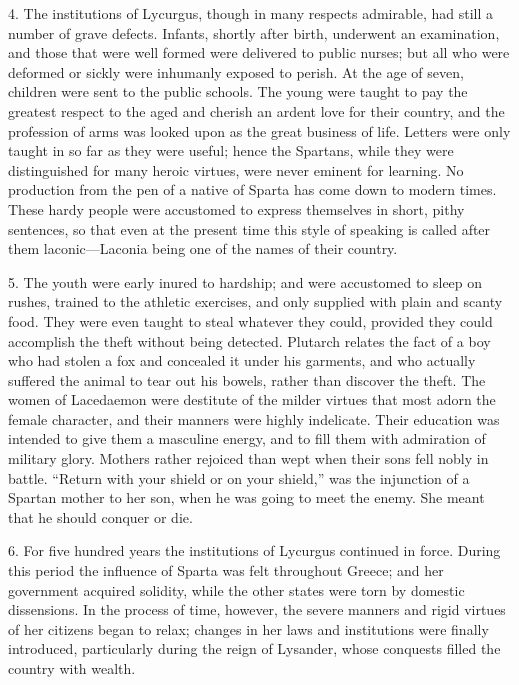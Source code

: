 \documentclass[openany,a4paper]{memoir}
\begin{document}
4. The institutions of Lycurgus, though in many respects 
admirable, had still a number of grave defects. Infants, shortly 
after birth, underwent an examination, and those that were 
well formed were delivered to public nurses; but all who 
were deformed or sickly were inhumanly exposed to perish. 
At the age of seven, children were sent to the public schools. 
The young were taught to pay the greatest respect to the 
aged and cherish an ardent love for their country, and the 
profession of arms was looked upon as the great business of 
life. Letters were only taught in so far as they were useful; 
hence the Spartans, while they were distinguished for many 
heroic virtues, were never eminent for learning. No production from the pen of a native of Sparta has come down to 
modern times. These hardy people were accustomed to express themselves in short, pithy sentences, so that even at 
the present time this style of speaking is called after them 
laconic---Laconia being one of the names of their country. 

5. The youth were early inured to hardship; and were 
accustomed to sleep on rushes, trained to the athletic exercises, and only supplied with plain and scanty food. They 
were even taught to steal whatever they could, provided 
they could accomplish the theft without being detected. 
Plutarch relates the fact of a boy who had stolen a fox and 
concealed it under his garments, and who actually suffered 
the animal to tear out his bowels, rather than discover the 
theft. The women of Lacedaemon were destitute of the 
milder virtues that most adorn the female character, and 
their manners were highly indelicate. Their education was 
intended to give them a masculine energy, and to fill them 
with admiration of military glory. Mothers rather rejoiced 
than wept when their sons fell nobly in battle. ``Return 
with your shield or on your shield,'' was the injunction of a 
Spartan mother to her son, when he was going to meet the 
enemy. She meant that he should conquer or die. 


6. For five hundred years the institutions of Lycurgus 
continued in force. During this period the influence of 
Sparta was felt throughout Greece; and her government 
acquired solidity, while the other states were torn by domestic dissensions. In the process of time, however, the 
severe manners and rigid virtues of her citizens began to 
relax; changes in her laws and institutions were finally introduced, particularly during the reign of Lysander, whose 
conquests filled the country with wealth. 
\end{document}
